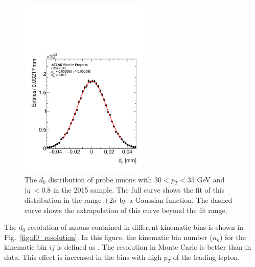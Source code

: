 \begin{figure}[htbp]
\centering
\includegraphics[width=0.55\textwidth]{figures/ZR/d0_smearing/fitDebug_lep_0_trk_d0_cor_kineticBinsResoFit-ZR_etaKinematicBinning_from_0p0_to_0p8_ptKinematicBinning_from_30p0_to_35p0_bin1-mu-Data.pdf}
\caption{
  The $d_0$ distribution of probe muons with $30 < p_T < 35$ GeV and $|\eta| < 0.8$ in the 2015 sample. 
  The full curve shows the fit of this distribution in the range $\pm2\dot\sigma$ by a Gaussian function. 
  The dashed curve shows the extrapolation of this curve beyond the fit range.
}
\label{fig:d0_2015_fitexample}
\end{figure}

The $d_0$ resolution of muons contained in different kinematic bins is shown in Fig.~\ref{fig:d0_resolution}.
In this figure, the kinematic bin number ($n_k$) for the kinematic bin $ij$ is defined as .
The resolution in Monte Carlo is better than in data.
This effect is increased in the bins with high $p_T$ of the leading lepton.

